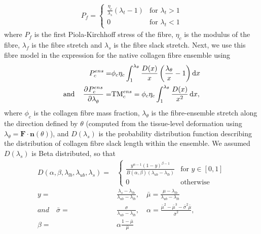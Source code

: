         \begin{equation}\label{c3:eqn:22}
        \begin{aligned}
        P_f = 
            \begin{cases} 
                \frac{\eta_c}{\lambda_s} \left(\lambda_t -1\right) & \text{for } \lambda_t >1\\
                0 & \text{for } \lambda_t < 1  
            \end{cases}
        \end{aligned}
        \end{equation}
    where $P_f$ is the first Piola-Kirchhoff stress of the fibre, $\eta_c$ is the modulus of the fibre, $\lambda_f$ is the fibre stretch and $\lambda_s$ is the fibre slack stretch. Next, we use this fibre model in the expression for the native collagen fibre ensemble using
        \begin{equation}\label{c3:eqn:23}
        \begin{aligned}
        P_c^{ens} =& \phi_c\eta_c\int_1^{\lambda_\theta}\frac{D(x)}{x} \left(\frac{\lambda_\theta}{x} - 1\right) \dif x    \\
        \text{and} \quad \dpd{P_c^{ens}}{\lambda_\theta} =&\mathrm{TM}_c^{ens} = \phi_c\eta_c\int_1^{\lambda_\theta}\frac{D(x)}{x^2}\dif x,
        \end{aligned}
        \end{equation}
    where $\phi_c$ is the collagen fibre mass fraction, $\lambda_\theta$ is the fibre-ensemble stretch along the direction defined by $\theta$ (computed from the tissue-level deformation using $\lambda_\theta = \mathbf{F}\cdot\mathbf{n}(\theta)$), and $D(\lambda_s)$ is the probability distribution function describing the distribution of collagen fibre slack length within the ensemble. We assumed $D(\lambda_s)$ is Beta distributed, so that
        \begin{equation}\label{c3:eqn:24}
        \begin{aligned}
        D(\alpha, \beta, \lambda_{lb}, \lambda_{ub}, \lambda_s) =& 
            \begin{cases}
            \frac{y^{\alpha-1}(1-y)^{\beta-1}}{B(\alpha,\beta)(\lambda_{ub}-\lambda_{lb})} & \text{for } y \in [0,1] \\
            0 & \text{otherwise}
            \end{cases} \\
        y=&\frac{\lambda_s-\lambda_{lb}}{\lambda_{ub}- \lambda_{lb}}, \quad \bar{\mu} =\frac{\mu - \lambda_{lb}}{\lambda_{ub}-\lambda_{lb}}   \\
        and \quad \bar{\sigma} =& \frac{\sigma}{\lambda_{ub} - \lambda_{lb}}, \quad \alpha = \frac{\bar{\mu}^2 - \bar{\mu}^3 - \bar{\sigma}^2\bar{\mu}}{\bar{\sigma}^2},   \\
        \beta =& \alpha \frac{1-\bar{\mu}}{\bar{\mu}}
        \end{aligned}
        \end{equation}
